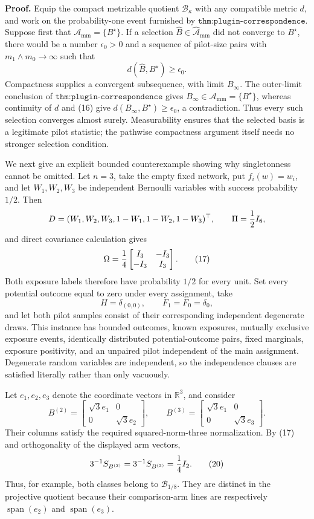 \textbf{Proof.}
Equip the compact metrizable quotient \(\mathcal B_\kappa\) with any compatible metric \(d\), and work on the probability-one event furnished by \(\texttt{thm:plugin-correspondence}\).  Suppose first that \(\mathcal A_{\mathrm{mm}}=\{B^\star\}\).  If a selection \(\widehat B\in\widehat{\mathcal A}_{\mathrm{mm}}\) did not converge to \(B^\star\), there would be a number \(\epsilon_0>0\) and a sequence of pilot-size pairs with \(m_1\wedge m_0\to\infty\) such that
\[
d(\widehat B,B^\star)\ge\epsilon_0.
\tag{16}
\]
Compactness supplies a convergent subsequence, with limit \(B_\infty\).  The outer-limit conclusion of \(\texttt{thm:plugin-correspondence}\) gives \(B_\infty\in\mathcal A_{\mathrm{mm}}=\{B^\star\}\), whereas continuity of \(d\) and (16) give \(d(B_\infty,B^\star)\ge\epsilon_0\), a contradiction.  Thus every such selection converges almost surely.  Measurability ensures that the selected basis is a legitimate pilot statistic; the pathwise compactness argument itself needs no stronger selection condition.

We next give an explicit bounded counterexample showing why singletonness cannot be omitted.  Let \(n=3\), take the empty fixed network, put \(f_i(w)=w_i\), and let \(W_1,W_2,W_3\) be independent Bernoulli variables with success probability \(1/2\).  Then
\[
D=(W_1,W_2,W_3,1-W_1,1-W_2,1-W_3)^{\top},
\qquad
\Pi={1\over2}I_6,
\]
and direct covariance calculation gives
\[
\Omega={1\over4}
\begin{bmatrix}
I_3&-I_3\\
-I_3&I_3
\end{bmatrix}.
\tag{17}
\]
Both exposure labels therefore have probability \(1/2\) for every unit.  Set every potential outcome equal to zero under every assignment, take
\[
H=\delta_{(0,0)},
\qquad
F_1=F_0=\delta_0,
\tag{18}
\]
and let both pilot samples consist of their corresponding independent degenerate draws.  This instance has bounded outcomes, known exposures, mutually exclusive exposure events, identically distributed potential-outcome pairs, fixed marginals, exposure positivity, and an unpaired pilot independent of the main assignment.  Degenerate random variables are independent, so the independence clauses are satisfied literally rather than only vacuously.

Let \(e_1,e_2,e_3\) denote the coordinate vectors in \(\mathbb R^3\), and consider
\[
B^{(2)}=
\begin{bmatrix}\sqrt3e_1&0\\0&\sqrt3e_2\end{bmatrix},
\qquad
B^{(3)}=
\begin{bmatrix}\sqrt3e_1&0\\0&\sqrt3e_3\end{bmatrix}.
\tag{19}
\]
Their columns satisfy the required squared-norm-three normalization.  By (17) and orthogonality of the displayed arm vectors,
\[
3^{-1}S_{B^{(2)}}=3^{-1}S_{B^{(3)}}={1\over4}I_2.
\tag{20}
\]
Thus, for example, both classes belong to \(\mathcal B_{1/8}\).  They are distinct in the projective quotient because their comparison-arm lines are respectively \(\operatorname{span}(e_2)\) and \(\operatorname{span}(e_3)\).

